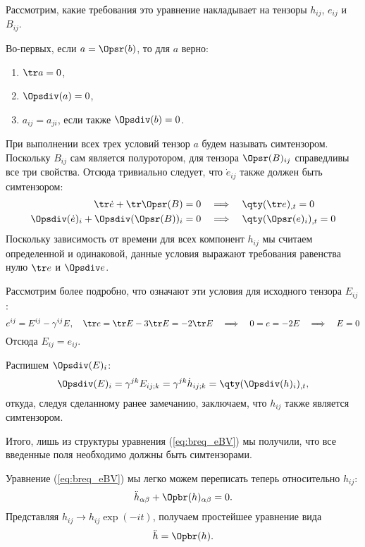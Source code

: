 \documentclass[\docroot/reports/draft/report.tex]{subfiles}
\begin{document}
    Рассмотрим, какие требования это уравнение накладывает на тензоры $h_{ij}$, $e_{ij}$ и $B_{ij}$.

    Во-первых, если $a = \Opsr(b)$, то для $a$ верно:
    \begin{enumerate}[nosep]
        \item $\tr a = 0$,
        \item $\Opsdiv(a) = 0$,
        \item $a_{ij} = a_{ji}$, если также $\Opsdiv(b) = 0$.
    \end{enumerate}

    При выполнении всех трех условий тензор $a$ будем называть симтензором. Поскольку $B_{ij}$ сам является полуротором, для тензора $\Opsr(B)_{ij}$ справедливы все три свойства. Отсюда тривиально следует, что $\dot{e}_{ij}$ также должен быть симтензором:
    \begin{align*}
        \tr \dot{e} + \tr \Opsr(B) = 0
            \quad&\Longrightarrow\quad \qty(\tr e)_{,t} = 0 \\
        \Opsdiv(\dot{e})_i + \Opsdiv(\Opsr(B))_i = 0
            \quad&\Longrightarrow\quad \qty(\Opsr(e)_i)_{,t} = 0
    \end{align*}
    Поскольку зависимость от времени для всех компонент $h_{ij}$ мы считаем определенной и одинаковой, данные условия выражают требования равенства нулю $\tr e$ и $\Opsdiv e$.

    Рассмотрим более подробно, что означают эти условия для исходного тензора $E_{ij}$:
    \begin{equation*}
        e^{ij} = E^{ij} - \gamma^{ij} E , \quad
        \tr e = \tr E - 3 \tr E = -2 \tr E \quad\Longrightarrow\quad
        0 = e = -2E \quad\Longrightarrow\quad
        E = 0
    \end{equation*}
    Отсюда $E_{ij} = e_{ij}$.

    Распишем $\Opsdiv(E)_i$:
    \begin{equation*}
        \Opsdiv(E)_i
            = \gamma^{jk} E_{ij;k}
            = \gamma^{jk} \dot{h}_{ij;k}
            = \qty(\Opsdiv(h)_i)_{,t} ,
    \end{equation*}
    откуда, следуя сделанному ранее замечанию, заключаем, что $h_{ij}$ также является симтензором.

    Итого, лишь из структуры уравнения (\ref{eq:breq_eBV}) мы получили, что все введенные поля необходимо должны быть симтензорами.

    Уравнение (\ref{eq:breq_eBV}) мы легко можем переписать теперь относительно $h_{ij}$:
    \begin{equation}
        \ddot{h}_{\alpha\beta} + \Opbr(h)_{\alpha\beta} = 0 .
    \end{equation}
    Представляя $h_{ij} \to h_{ij} \exp(-it)$, получаем простейшее уравнение вида
    \begin{equation}
        \ddot{h} = \Opbr(h) .
    \end{equation}

\end{document}
